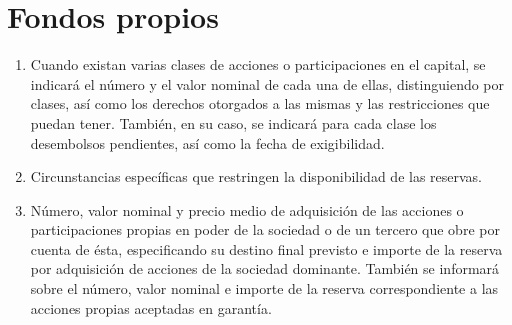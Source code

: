 \documentclass[11pt,a4paper]{article}
\begin{document}
\section{Fondos propios}
\begin{enumerate}
 \item Cuando existan varias clases de acciones o participaciones en el capital, se indicará el número y el valor nominal de cada una de ellas, distinguiendo por clases, así como los derechos otorgados a las mismas y las restricciones que puedan tener. También, en su caso, se indicará para cada clase los desembolsos pendientes, así como la fecha de exigibilidad.

\item Circunstancias específicas que restringen la disponibilidad de las reservas.

\item Número, valor nominal y precio medio de adquisición de las acciones o participaciones propias en poder de la sociedad o de un tercero que obre por cuenta de ésta, especificando su destino final previsto e importe de la reserva por adquisición de acciones de la sociedad dominante. También se informará sobre el número, valor nominal e importe de la reserva correspondiente a las acciones propias aceptadas en garantía.
\end{enumerate}
\end{document}
